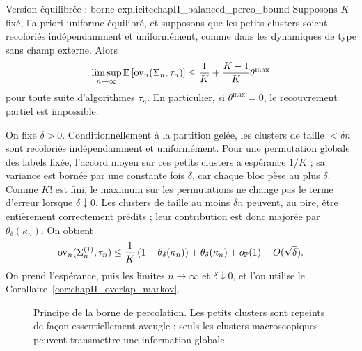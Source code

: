 \begin{Theoreme}{Version équilibrée : borne explicite}{chapII_balanced_perco_bound}
Supposons $K$ fixé, l'a priori uniforme équilibré, et supposons que les petits clusters soient recoloriés indépendamment et uniformément, comme dans les dynamiques de type \SW{} sans champ externe. Alors
\begin{equation}
    \limsup_{n\to\infty}
    \mathbb E\left[\operatorname{ov}_n(\Sigma_n,\tau_n)\right]
    \le
    \frac1K+\frac{K-1}{K}\theta^{\max}
    \label{eq:chapII_balanced_perco_bound}
\end{equation}
pour toute suite d'algorithmes $\tau_n$. En particulier, si $\theta^{\max}=0$, le recouvrement partiel est impossible.
\end{Theoreme}

\begin{Preuve}
On fixe $\delta>0$. Conditionnellement à la partition gelée, les clusters de taille $<\delta n$ sont recoloriés indépendamment et uniformément. Pour une permutation globale des labels fixée, l'accord moyen sur ces petits clusters a espérance $1/K$ ; sa variance est bornée par une constante fois $\delta$, car chaque bloc pèse au plus $\delta$. Comme $K!$ est fini, le maximum sur les permutations ne change pas le terme d'erreur lorsque $\delta\downarrow0$. Les clusters de taille au moins $\delta n$ peuvent, au pire, être entièrement correctement prédits ; leur contribution est donc majorée par $\theta_\delta(\kappa_n)$. On obtient
\[
    \operatorname{ov}_n(\Sigma_n^{(1)},\tau_n)
    \le
    \frac1K\left(1-\theta_\delta(\kappa_n)\right)
    +\theta_\delta(\kappa_n)
    +o_{\mathbb P}(1)+O(\sqrt{\delta}).
\]
On prend l'espérance, puis les limites $n\to\infty$ et $\delta\downarrow0$, et l'on utilise le Corollaire~\ref{cor:chapII_overlap_markov}.
\end{Preuve}

\begin{figure}[H]
\centering
{}
\caption{Principe de la borne de percolation. Les petits clusters sont repeints de façon essentiellement aveugle ; seuls les clusters macroscopiques peuvent transmettre une information globale.}
\label{fig:chapII_perco_obstruction}
\end{figure}

